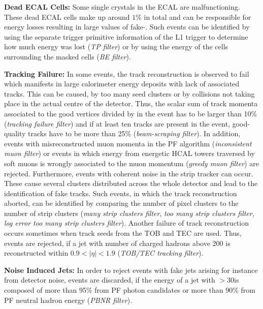 \begin{description}
 \item{\textbf{Dead ECAL Cells:}} Some single crystals in the ECAL are malfunctioning. These dead ECAL cells make up around $1\%$ in total and can be responsible for energy losses resulting in large values of fake-\MHT. Such events can be identified by using the separate trigger primitive information of the L1 trigger to determine how much energy was lost (\textit{TP filter}) or by using the energy of the cells surrounding the masked cells (\textit{BE filter}).
 \item{\textbf{Tracking Failure:}} In some events, the track reconstruction is observed to fail which manifests in large calorimeter energy deposits with lack of associated tracks. This can be caused, \eg by too many seed clusters or by collisions not taking place in the actual centre of the detector. Thus, the scalar sum of track momenta associated to the good vertices divided by \HT in the event has to be larger than 10\% (\textit{tracking failure filter}) and if at least ten tracks are present in the event, good-quality tracks have to be more than 25\% (\textit{beam-scraping filter}). In addition, events with misreconstructed muon momenta in the PF algorithm (\textit{inconsistent muon filter}) or events in which energy from energetic HCAL towers traversed by soft muons is wrongly associated to the muon momentum (\textit{greedy muon filter}) are rejected. Furthermore, events with coherent noise in the strip tracker can occur. These cause several clusters distributed across the whole detector and lead to the identification of fake tracks. Such events, in which the track reconstruction aborted, can be identified by comparing the number of pixel clusters to the number of strip clusters (\textit{many strip clusters filter}, \textit{too many strip clusters filter}, \textit{log error too many strip clusters filter}). Another failure of track reconstruction occurs sometimes when track seeds from the TOB and TEC are used. Thus, events are rejected, if a jet with number of charged hadrons above 200 is reconstructed within $0.9 < |\eta| < 1.9$ (\textit{TOB/TEC tracking filter}).
 \item{\textbf{Noise Induced Jets:}} In order to reject events with fake jets arising for instance from detector noise, events are discarded, if the energy of a jet with \pt$ > 30$\gev is composed of more than 95\% from PF photon candidates or more than 90\% from PF neutral hadron energy (\textit{PBNR filter}).
\end{description}

